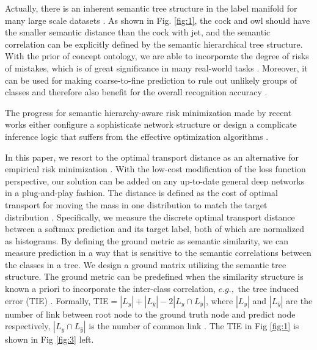 \documentclass{article}
\theoremstyle{plain}%
\begin{document}
Actually, there is an inherent semantic tree structure in the label manifold for many large scale datasets \cite{ceci2007classifying}. As shown in Fig. \ref{fig:1}, the cock and owl should have the smaller semantic distance than the cock with jet, and the semantic correlation can be explicitly defined by the semantic hierarchical tree structure. With the prior of concept ontology, we are able to incorporate the degree of risks of mistakes, which is of great significance in many real-world tasks \cite{wang2020hierarchical}. Moreover, it can be used for making coarse-to-fine prediction to rule out unlikely groups of classes and therefore also benefit for the overall recognition accuracy \cite{zhao2018embedding}. 






The progress for semantic hierarchy-aware risk minimization made by recent works either configure a sophisticate network structure or design a complicate inference logic that suffers from the effective optimization algorithms \cite{wang2017local,lee2018hierarchical,khan2017cost}.






In this paper, we resort to the optimal transport distance as an alternative for empirical risk minimization \cite{liu2019unimodala,liu2019conservative,liu2020importance,liu2020wasserstein}. With the low-cost modification of the loss function perspective, our solution can be added on any up-to-date general deep networks in a plug-and-play fashion. The distance is defined as the cost of optimal transport for moving the mass in one distribution to match the target distribution \cite{liu2020severity,han2020wasserstein}. Specifically, we measure the discrete optimal transport distance between a softmax prediction and its target label, both of which are normalized as histograms. By defining the ground metric as semantic similarity, we can measure prediction in a way that is sensitive to the semantic correlations between the classes in a tree. We design a ground matrix utilizing the semantic tree structure. The ground metric can be predefined when the similarity structure is known a priori to incorporate the inter-class correlation, $e.g.,$ the tree induced error (TIE) \cite{silla2011survey}. Formally, TIE$=|L_y|+|L_{\hat{y}}|-2|L_y\cap L_{\hat{y}}|$, where $|L_y|$ and $|L_{\hat{y}}|$ are the number of link between root node to the ground truth node and predict node respectively, $|L_y\cap L_{\hat{y}}|$ is the number of common link \cite{kosmopoulos2015evaluation}. The TIE in Fig \ref{fig:1} is shown in Fig \ref{fig:3} left.
\end{document}
